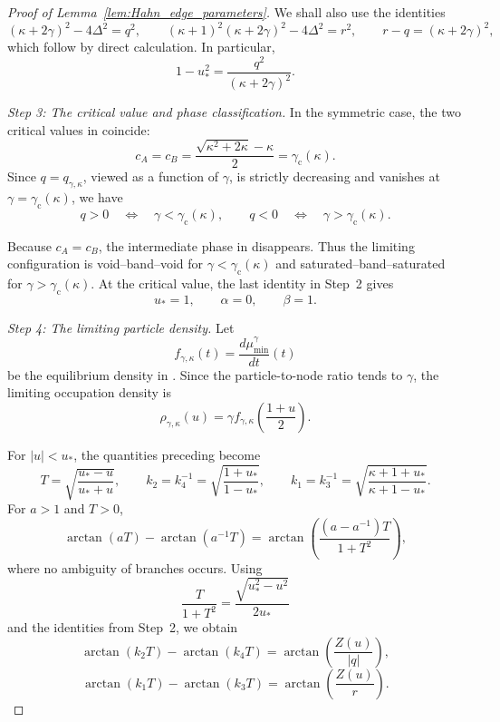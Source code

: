\documentclass[reqno,11pt]{amsart}
\theoremstyle{plain}
\theoremstyle{definition}
\numberwithin{equation}{section}
\begin{document}
\begin{proof}[Proof of Lemma~\ref{lem:Hahn_edge_parameters}]
We shall also use the identities
\[
(\kappa+2\gamma)^2-4\Delta^2=q^2,
\qquad
(\kappa+1)^2(\kappa+2\gamma)^2-4\Delta^2=r^2,
\qquad
r-q=(\kappa+2\gamma)^2,
\]
which follow by direct calculation. In particular,
\[
1-u_{\ast}^2
=
\frac{q^2}{(\kappa+2\gamma)^2}.
\]

\medskip
\noindent
\emph{Step 3: The critical value and phase classification.}
In the symmetric case, the two critical values in
\cite[formula~(2.73)]{baik2007discrete} coincide:
\[
c_A=c_B
=
\frac{\sqrt{\kappa^2+2\kappa}-\kappa}{2}
=
\gamma_{\mathrm c}(\kappa).
\]
Since $q=q_{\gamma,\kappa}$, viewed as a function of $\gamma$, is
strictly decreasing and vanishes at
$\gamma=\gamma_{\mathrm c}(\kappa)$, we have
\[
q>0
\quad\Longleftrightarrow\quad
\gamma<\gamma_{\mathrm c}(\kappa),
\qquad
q<0
\quad\Longleftrightarrow\quad
\gamma>\gamma_{\mathrm c}(\kappa).
\]

Because $c_A=c_B$, the intermediate phase in
\cite[Theorem~2.17]{baik2007discrete} disappears. Thus the limiting
configuration is void--band--void for
$\gamma<\gamma_{\mathrm c}(\kappa)$ and
saturated--band--saturated for
$\gamma>\gamma_{\mathrm c}(\kappa)$. At the critical value, the last
identity in Step~2 gives
\[
u_{\ast}=1,
\qquad
\alpha=0,
\qquad
\beta=1.
\]

\medskip
\noindent
\emph{Step 4: The limiting particle density.}
Let
\[
f_{\gamma,\kappa}(t)
=
\frac{d\mu_{\min}^{\gamma}}{dt}(t)
\]
be the equilibrium density in
\cite[Theorem~2.17]{baik2007discrete}. Since the particle-to-node
ratio tends to $\gamma$, the limiting occupation density is
\[
\rho_{\gamma,\kappa}(u)
=
\gamma
f_{\gamma,\kappa}\left(\frac{1+u}{2}\right).
\]

For $|u|<u_{\ast}$, the quantities preceding
\cite[Theorem~2.17]{baik2007discrete} become
\[
T = \sqrt{\frac{u_{\ast}-u}{u_{\ast}+u}},
\qquad
k_2=k_4^{-1} =
\sqrt{\frac{1+u_{\ast}}{1-u_{\ast}}}, 
\qquad
k_1=k_3^{-1} =
\sqrt{
\frac{\kappa+1+u_{\ast}}
     {\kappa+1-u_{\ast}}
}.
\]
For $a>1$ and $T>0$,
\[
\arctan(aT)-\arctan(a^{-1}T)
=
\arctan\left(
\frac{(a-a^{-1})T}{1+T^2}
\right),
\]
where no ambiguity of branches occurs. Using
\[
\frac{T}{1+T^2}
=
\frac{\sqrt{u_{\ast}^2-u^2}}{2u_{\ast}}
\]
and the identities from Step~2, we obtain
\[
\arctan(k_2T)-\arctan(k_4T)
=
\arctan\left(
\frac{Z(u)}{|q|}
\right),
\]
\[
\arctan(k_1T)-\arctan(k_3T)
=
\arctan\left(
\frac{Z(u)}{r}
\right).
\]


\end{proof}
\end{document}
